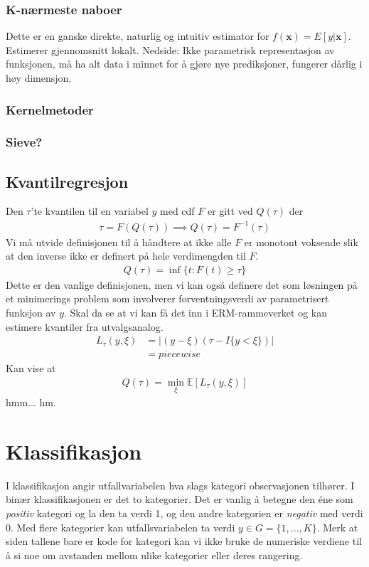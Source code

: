 \subsubsection{K-nærmeste naboer}
Dette er en ganske direkte, naturlig og intuitiv estimator for $f(\mathbf{x})=E[y|\mathbf{x}]$. Estimerer gjennomsnitt lokalt. Nedside: Ikke parametrisk representasjon av funksjonen, må ha alt data i minnet for å gjøre nye prediksjoner, fungerer dårlig i høy dimensjon.
\subsubsection{Kernelmetoder}
\subsubsection{Sieve?}
\subsection{Kvantilregresjon}
Den $\tau$'te kvantilen til en variabel $y$ med cdf $F$ er gitt ved $Q(\tau)$ der
\begin{align}
\tau = F(Q(\tau)) \implies Q(\tau) = F^{-1}(\tau)
\end{align}
Vi må utvide definisjonen til å håndtere at ikke alle $F$ er monotont voksende slik at den inverse ikke er definert på hele verdimengden til $F$.
\begin{align}
Q(\tau) = \inf\{t:F(t)\geq \tau\}
\end{align}
Dette er den vanlige definisjonen, men vi kan også definere det som løsningen på et minimerings problem som involverer forventningsverdi av parametrisert funksjon av $y$. Skal da se at vi kan få det inn i ERM-rammeverket og kan estimere kvantiler fra utvalgsanalog. 
\begin{align}
L_{\tau}(y,\xi) &= |(y-\xi)(\tau-I\{y<\xi\})| \\
&= piecewise
\end{align}
Kan vise at 
\begin{align}
Q(\tau) = \min_{\xi} \mathbb{E}[L_{\tau}(y,\xi)]
\end{align}
hmm... hm.
\section{Klassifikasjon}
I klassifikasjon angir utfallvariabelen hva slags kategori observasjonen tilhører. I binær klassifikasjonen er det to kategorier. Det er vanlig å betegne den éne som \textit{positiv} kategori og la den ta verdi 1, og den andre kategorien er \textit{negativ} med verdi 0. Med flere kategorier kan utfallsvariabelen ta verdi $y \in G=\{1,...,K\}$. Merk at siden tallene bare er kode for kategori kan vi ikke bruke de numeriske verdiene til å si noe om avstanden mellom ulike kategorier eller deres rangering.

